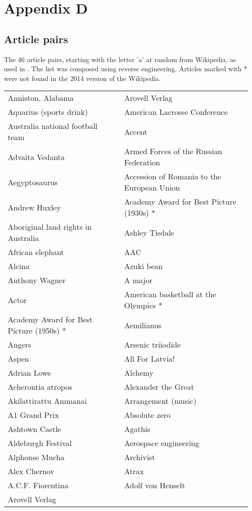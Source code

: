 \appendix

\chapter{Appendix D}
\label{appendix:ArticleParis}
\section{Article pairs}
The 46 article pairs, starting with the letter 'a' at random from Wikipedia, as used in \citep{hwang2015}. The list was composed using reverse engineering. Articles marked with * were not found in the 2014 version of the Wikipedia.\\

\begin{tabular}{lll}

Anniston, Alabama & Arovell Verlag \\
Aquarius (sports drink) & American Lacrosse Conference \\
Australia national football team & Accent \\
Advaita Vedanta & Armed Forces of the Russian Federation \\
Aegyptosaurus & Accession of Romania to the European Union \\
Andrew Huxley & Academy Award for Best Picture (1930s) * \\
Aboriginal land rights in Australia & Ashley Tisdale \\
African elephant & AAC \\
Alcina & Azuki bean \\
Anthony Wagner & A major \\
Actor & American basketball at the Olympics * \\
Academy Award for Best Picture (1950s) * & Aemilianus \\
Angers & Arsenic triiodide \\
Aspen & All For Latvia! \\
Adrian Lowe & Alchemy \\
Acherontia atropos & Alexander the Great \\
Akilattirattu Ammanai & Arrangement (music) \\
A1 Grand Prix & Absolute zero \\
Ashtown Castle & Agathis \\
Aldeburgh Festival & Aerospace engineering \\
Alphonse Mucha & Archivist \\
Alex Chernov & Atrax \\
A.C.F. Fiorentina & Adolf von Henselt \\
Arovell Verlag &   \\

\end{tabular}